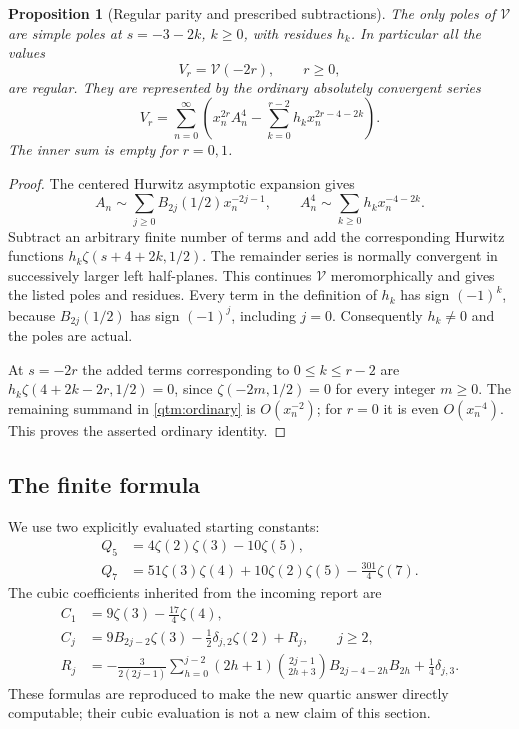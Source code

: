 \documentclass[11pt,a4paper]{article}
\numberwithin{equation}{section}
\theoremstyle{plain}
\newtheorem{proposition}[theorem]{Proposition}
\theoremstyle{definition}
\theoremstyle{remark}
\begin{document}
\begin{proposition}[Regular parity and prescribed subtractions]
\label{qtm:regularity}
The only poles of $\mathcal V$ are simple poles at $s=-3-2k$,
$k\ge0$, with residues $h_k$.  In particular all the values
\begin{equation}\label{qtm:Vr}
 V_r=\mathcal V(-2r),\qquad r\ge0,
\end{equation}
are regular.  They are represented by the ordinary absolutely convergent
series
\begin{equation}\label{qtm:ordinary}
 \boxed{\displaystyle
 V_r=\sum_{n=0}^{\infty}\left(
 x_n^{2r}A_n^4-\sum_{k=0}^{r-2}h_kx_n^{2r-4-2k}\right).}
\end{equation}
The inner sum is empty for $r=0,1$.
\end{proposition}

\begin{proof}
The centered Hurwitz asymptotic expansion gives
\[
 A_n\sim\sum_{j\ge0}B_{2j}(1/2)x_n^{-2j-1},\qquad
 A_n^4\sim\sum_{k\ge0}h_kx_n^{-4-2k}.
\]
Subtract an arbitrary finite number of terms and add the corresponding
Hurwitz functions $h_k\zeta(s+4+2k,1/2)$.  The remainder series is
normally convergent in successively larger left half-planes.  This
continues $\mathcal V$ meromorphically and gives the listed poles and
residues.  Every term in the definition of $h_k$ has sign $(-1)^k$,
because $B_{2j}(1/2)$ has sign $(-1)^j$, including $j=0$.
Consequently $h_k\ne0$ and the poles are actual.

At $s=-2r$ the added terms corresponding to $0\le k\le r-2$
are $h_k\zeta(4+2k-2r,1/2)=0$, since
$\zeta(-2m,1/2)=0$ for every integer $m\ge0$.  The remaining
summand in \eqref{qtm:ordinary} is $O(x_n^{-2})$; for $r=0$ it
is even $O(x_n^{-4})$.  This proves the asserted ordinary identity.
\end{proof}

\subsection{The finite formula}

We use two explicitly evaluated starting constants:
\begin{align}
 Q_5&=4\zeta(2)\zeta(3)-10\zeta(5),\label{qtm:Q5}\\
 Q_7&=51\zeta(3)\zeta(4)+10\zeta(2)\zeta(5)
                  -\frac{301}{4}\zeta(7).\label{qtm:Q7}
\end{align}
The cubic coefficients inherited from the incoming report are
\begin{align}
 C_1&=9\zeta(3)-\frac{17}{4}\zeta(4),\label{qtm:C1}\\
 C_j&=9B_{2j-2}\zeta(3)-\frac12\delta_{j,2}\zeta(2)
       +R_j,\qquad j\ge2,\label{qtm:Cj}\\
 R_j&=-\frac{3}{2(2j-1)}
 \sum_{h=0}^{j-2}(2h+1)\binom{2j-1}{2h+3}
 B_{2j-4-2h}B_{2h}+\frac14\delta_{j,3}.
 \label{qtm:Rj}
\end{align}
These formulas are reproduced to make the new quartic answer directly
computable; their cubic evaluation is not a new claim of this section.
\end{document}
